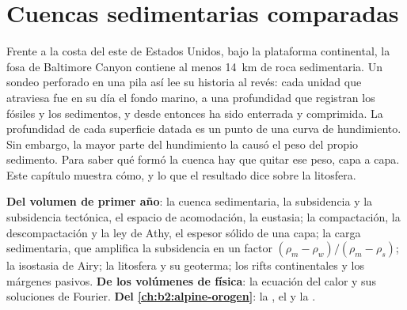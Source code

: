 \chapter{Cuencas sedimentarias comparadas}\label{ch:b2:basins-compared}

Frente a la costa del este de Estados Unidos, bajo la plataforma continental, la fosa de Baltimore
Canyon contiene al menos \qty{14}{km} de roca sedimentaria. Un sondeo perforado en una
pila así lee su historia al revés: cada unidad que atraviesa fue en su día el fondo marino, a una profundidad que
registran los fósiles y los sedimentos, y desde entonces ha sido enterrada y comprimida. La profundidad de cada
superficie datada es un punto de una curva de hundimiento. Sin embargo, la mayor parte del hundimiento la causó el
peso del propio sedimento. Para saber qué formó la cuenca hay que quitar ese peso,
capa a capa. Este capítulo muestra cómo, y lo que el resultado dice sobre la litosfera.

\begin{recall}
\textbf{Del volumen de primer año}: la cuenca sedimentaria, la subsidencia y la subsidencia tectónica,
el espacio de acomodación, la eustasia; la compactación, la descompactación y la ley de Athy, el espesor sólido de una
capa; la carga sedimentaria, que amplifica la subsidencia en un factor $(\rho_m - \rho_w)/(\rho_m - \rho_s)$;
la isostasia de Airy; la litosfera y su geoterma; los rifts continentales y los márgenes pasivos.
\textbf{De los volúmenes de física}: la ecuación del calor y sus soluciones de Fourier.
\textbf{Del \cref{ch:b2:alpine-orogen}}: la , el  y la .
\end{recall}

